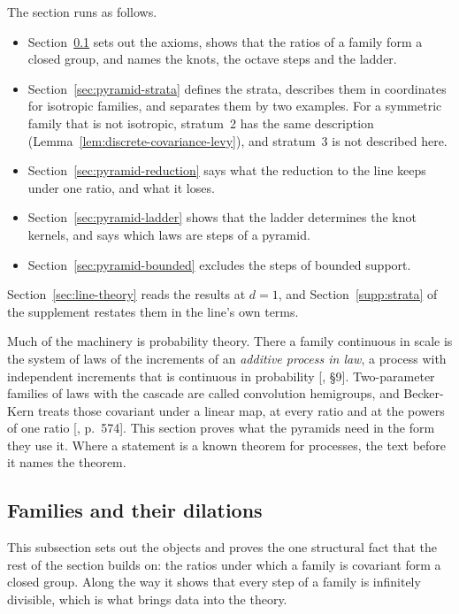 The section runs as follows.
\begin{itemize}
\item Section~\ref{sec:pyramid-families} sets out the axioms, shows that the ratios of a family form
a closed group, and names the knots, the octave steps and the ladder.
\item Section~\ref{sec:pyramid-strata} defines the strata, describes them in \Levy{} coordinates
for isotropic families, and separates them by two examples. For a symmetric family that is not
isotropic, stratum~2 has the same description (Lemma~\ref{lem:discrete-covariance-levy}), and
stratum~3 is not described here.
\item Section~\ref{sec:pyramid-reduction} says what the reduction to the line keeps under one ratio,
and what it loses.
\item Section~\ref{sec:pyramid-ladder} shows that the ladder determines the knot kernels, and says
which laws are steps of a pyramid.
\item Section~\ref{sec:pyramid-bounded} excludes the steps of bounded support.
\end{itemize}
Section~\ref{sec:line-theory} reads the results at $d = 1$, and Section~\ref{supp:strata} of the
supplement restates them in the line's own terms.

Much of the machinery is probability theory. There a family continuous in scale is the system of
laws of the increments of an \emph{additive process in law}, a process with independent increments
that is continuous in probability [, \S 9]. Two-parameter families of laws
with the cascade are called convolution hemigroups, and Becker-Kern treats those covariant under a
linear map, at every ratio and at the powers of one ratio [, p.~574].
This section proves what the pyramids need in the form they use it. Where a statement is a known
theorem for processes, the text before it names the theorem.

\subsection{Families and their dilations}
\label{sec:pyramid-families}

This subsection sets out the objects and proves the one structural fact that the rest of the section
builds on: the ratios under which a family is covariant form a closed group. Along the way it shows
that every step of a family is infinitely divisible, which is what brings \Levy{} data into the
theory.

